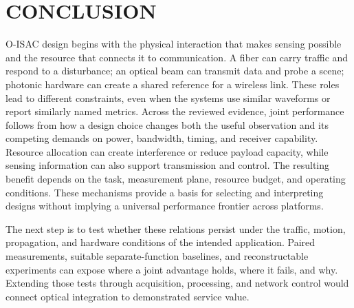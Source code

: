 \section{CONCLUSION}
\label{sec:conclusion}

O-ISAC design begins with the physical interaction that makes sensing possible
and the resource that connects it to communication. A fiber can carry traffic
and respond to a disturbance; an optical beam can transmit data and probe a
scene; photonic hardware can create a shared reference for a wireless link.
These roles lead to different constraints, even when the systems use similar
waveforms or report similarly named metrics. Across the reviewed evidence,
joint performance follows from how a design
choice changes both the useful observation and its competing demands on
power, bandwidth, timing, and receiver capability. Resource allocation can
create interference or reduce payload capacity, while sensing information can
also support transmission and control. The resulting benefit depends on the
task, measurement plane, resource budget, and operating conditions. These
mechanisms provide a basis for selecting and interpreting designs without
implying a universal performance frontier across platforms.

The next step is to test whether these relations persist under the traffic,
motion, propagation, and hardware conditions of the intended application.
Paired measurements, suitable separate-function baselines, and reconstructable
experiments can expose where a joint advantage holds, where it fails, and why.
Extending those tests through acquisition, processing, and network control
would connect optical integration to demonstrated service value.
